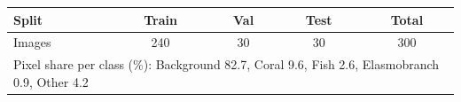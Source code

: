 \begin{tabular}{lcccc}
\toprule
Split & Train & Val & Test & Total \\
\midrule
Images & 240 & 30 & 30 & 300 \\
\midrule
\multicolumn{5}{l}{Pixel share per class (\%): Background 82.7, Coral 9.6, Fish 2.6, Elasmobranch 0.9, Other 4.2} \\
\bottomrule
\end{tabular}
